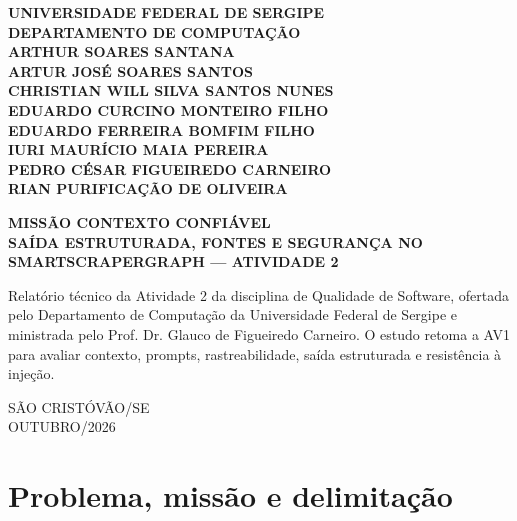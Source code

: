 \documentclass[a4paper,12pt]{article}
\begin{document}
\onehalfspacing
\begin{titlepage}\thispagestyle{empty}
\begin{center}
\textbf{UNIVERSIDADE FEDERAL DE SERGIPE}\\
\textbf{DEPARTAMENTO DE COMPUTAÇÃO}\\[1cm]
\textbf{ARTHUR SOARES SANTANA\\ARTUR JOSÉ SOARES SANTOS\\CHRISTIAN WILL SILVA SANTOS NUNES\\EDUARDO CURCINO MONTEIRO FILHO\\EDUARDO FERREIRA BOMFIM FILHO\\IURI MAURÍCIO MAIA PEREIRA\\PEDRO CÉSAR FIGUEIREDO CARNEIRO\\RIAN PURIFICAÇÃO DE OLIVEIRA}
\vspace{1.4cm}

\textbf{\Large MISSÃO CONTEXTO CONFIÁVEL}\\[0.4cm]
\textbf{SAÍDA ESTRUTURADA, FONTES E SEGURANÇA NO SMARTSCRAPERGRAPH --- ATIVIDADE 2}
\end{center}
\vspace{1cm}
\begin{flushright}\begin{minipage}{0.65\textwidth}
\onehalfspacing
Relatório técnico da Atividade 2 da disciplina de Qualidade de Software, ofertada pelo Departamento de Computação da Universidade Federal de Sergipe e ministrada pelo Prof. Dr. Glauco de Figueiredo Carneiro. O estudo retoma a AV1 para avaliar contexto, prompts, rastreabilidade, saída estruturada e resistência à injeção.
\end{minipage}\end{flushright}
\vfill\begin{center}SÃO CRISTÓVÃO/SE\\OUTUBRO/2026\end{center}
\end{titlepage}
\tableofcontents\clearpage{}

\section{Problema, missão e delimitação}
\end{document}
